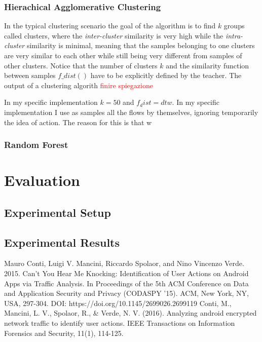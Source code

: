 \documentclass[a4paper,10pt]{scrartcl}
\newcommand\todo[1]{\textcolor{red}{#1}}
\begin{document}
\subsubsection{Hierachical Agglomerative Clustering}
In the typical clustering scenario the goal of the algorithm is to find $k$ groups called clusters, where the \textit{inter-cluster} similarity is very high while the \textit{intra-cluster} similarity is minimal, meaning that the samples belonging to one clusters are very similar to each other while still being very different from samples of other clusters. Notice that the number of clusters $k$ and the similarity function between samples $f\_dist()$ have to be explicitly defined by the teacher. The output of a clustering algorith \todo{finire spiegazione}

In my specific implementation $k = 50$ and $f_dist = dtw$.
In my specific implementation I use as samples all the flows by themselves, ignoring temporarily the idea of action. The reason for this is that w
\subsubsection{Random Forest}

\section{Evaluation}
\subsection{Experimental Setup}
\subsection{Experimental Results}



\begin{thebibliography}{99}
Mauro Conti, Luigi V. Mancini, Riccardo Spolaor, and Nino Vincenzo Verde. 2015. Can't You Hear Me Knocking: Identification of User Actions on Android Apps via Traffic Analysis. In Proceedings of the 5th ACM Conference on Data and Application Security and Privacy (CODASPY '15). ACM, New York, NY, USA, 297-304. DOI: https://doi.org/10.1145/2699026.2699119
 Conti, M., Mancini, L. V., Spolaor, R., \& Verde, N. V. (2016). Analyzing android encrypted network traffic to identify user actions. IEEE Transactions on Information Forensics and Security, 11(1), 114-125.


\end{thebibliography}
\end{document}
